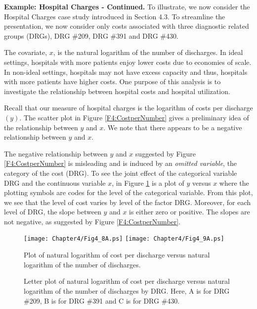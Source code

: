 \linejed

\textbf{Example: Hospital Charges - Continued.} To illustrate, we
now consider the Hospital Charges case study introduced in Section
4.3. To streamline the presentation, we now consider only costs
associated with three diagnostic related groups (DRGs), DRG \#209,
DRG \#391 and DRG \#430.

The covariate, $x$, is the natural logarithm of the number of
discharges. In ideal settings, hospitals with more patients enjoy
lower costs due to economies of scale. In non-ideal settings,
hospitals may not have excess capacity and thus, hospitals with more
patients have higher costs. One purpose of this analysis is to
investigate the relationship between hospital costs and hospital
utilization.

Recall that our measure of hospital charges is the logarithm of
costs per discharge $(y)$. The scatter plot in Figure
\ref{F4:CostperNumber} gives a preliminary idea of the relationship
between $y$ and $x$. We note that there appears to be a negative
relationship between $y$ and $x$.

The negative relationship between $y$ and $x$ suggested by Figure
\ref{F4:CostperNumber} is misleading and is induced by an
\textit{omitted variable}, the category of the cost (DRG). To see
the joint effect of the categorical variable DRG and the continuous
variable $x$, in Figure \ref{F4:DRGbyNumber} is a plot of $y$ versus
$x$ where the plotting symbols are codes for the level of the
categorical variable. From this plot, we see that the level of cost
varies by level of the factor DRG. Moreover, for each level of DRG,
the slope between $y$ and $x$ is either zero or positive. The slopes
are not negative, as suggested by Figure \ref{F4:CostperNumber}.

\begin{figure}[htp]
  \begin{center}
    \texttt{[image: Chapter4/Fig4\_8A.ps]}
    \texttt{[image: Chapter4/Fig4\_9A.ps]} \hfill
    \parbox[t]{2.5in}{\caption{\label{F4:CostperNumber} \small  Plot of natural logarithm of cost per discharge versus natural
logarithm of the number of discharges.}} \hfill
    \parbox[t]{2.5in}{\caption{\label{F4:DRGbyNumber} \small  Letter plot of natural logarithm of cost per discharge versus natural
logarithm of the number of discharges by DRG. Here, A is for DRG
\#209, B is for DRG \#391 and C is for DRG \#430.}}
  \end{center}
\end{figure}


